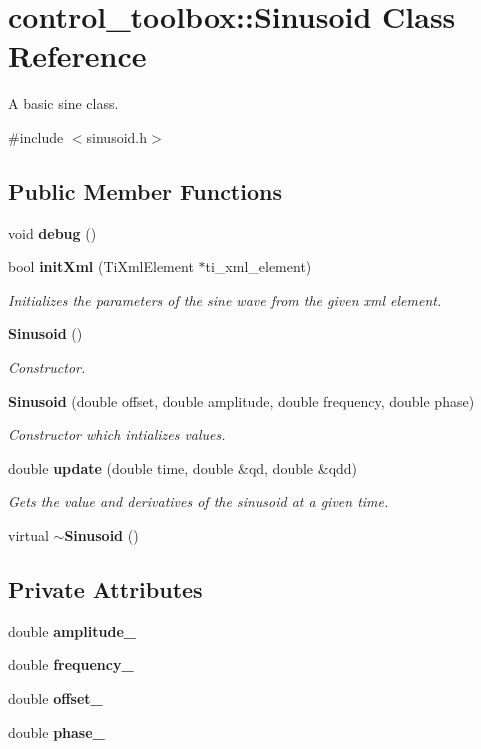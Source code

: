 \section{control\-\_\-toolbox\-:\-:\-Sinusoid \-Class \-Reference}
\label{classcontrol__toolbox_1_1Sinusoid}


\-A basic sine class.  




{\ttfamily \#include $<$sinusoid.\-h$>$}

\subsection*{\-Public \-Member \-Functions}
\begin{DoxyCompactItemize}
\item 
void {\bf debug} ()
\item 
bool {\bf init\-Xml} (\-Ti\-Xml\-Element $\ast$ti\-\_\-xml\-\_\-element)
\begin{DoxyCompactList}\small\item\em \-Initializes the parameters of the sine wave from the given xml element. \end{DoxyCompactList}\item 
{\bf \-Sinusoid} ()
\begin{DoxyCompactList}\small\item\em \-Constructor. \end{DoxyCompactList}\item 
{\bf \-Sinusoid} (double offset, double amplitude, double frequency, double phase)
\begin{DoxyCompactList}\small\item\em \-Constructor which intializes values. \end{DoxyCompactList}\item 
double {\bf update} (double time, double \&qd, double \&qdd)
\begin{DoxyCompactList}\small\item\em \-Gets the value and derivatives of the sinusoid at a given time. \end{DoxyCompactList}\item 
virtual {\bf $\sim$\-Sinusoid} ()
\end{DoxyCompactItemize}
\subsection*{\-Private \-Attributes}
\begin{DoxyCompactItemize}
\item 
double {\bf amplitude\-\_\-}
\item 
double {\bf frequency\-\_\-}
\item 
double {\bf offset\-\_\-}
\item 
double {\bf phase\-\_\-}
\end{DoxyCompactItemize}



